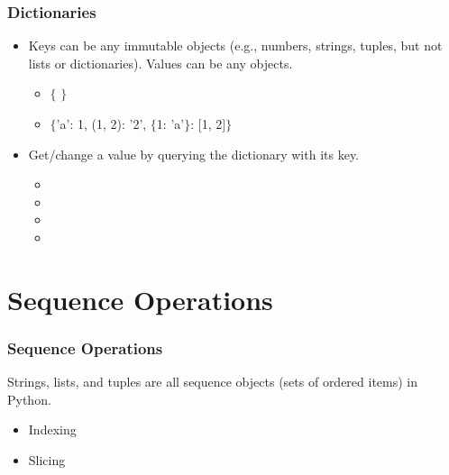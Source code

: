 \documentclass[xcolor={usenames, dvipsnames}, hyperref={colorlinks,linkcolor=black, urlcolor=blue}]{beamer}
\begin{document}


\begin{frame}
\frametitle{Dictionaries}

\begin{itemize}
\item Keys can be any immutable objects (e.g., numbers, strings, tuples, but not lists or dictionaries). Values can be any objects.
	\begin{itemize}
	\item $\{$ $\}$
	\item $\{${\color{red}'a': 1}, {\color{Dandelion}(1, 2): '2'}, {\color{CornflowerBlue}$\{$1: 'a'$\}$: $[$1, 2$]$}$\}$
	\end{itemize}
\end{itemize}

\begin{itemize}
\item Get/change a value by querying the dictionary with its key.
	\begin{itemize}
	\item {}
	\item {}
	\item {}
	\item {}
	\end{itemize}
\end{itemize}

\end{frame}


\section{Sequence Operations}
\begin{frame}
\frametitle{Sequence Operations}

Strings, lists, and tuples are all sequence objects (sets of ordered items) in Python. 

\begin{itemize}
\item Indexing
\item Slicing
\end{itemize}
\end{frame}
\end{document}
